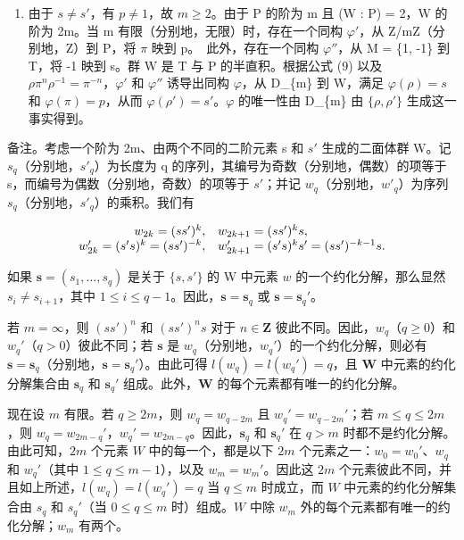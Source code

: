 \begin{enumerate}
\def\labelenumi{(\roman{enumi})}
\setcounter{enumi}{1}
\tightlist
\item
  由于 \(s \neq s'\)，有 \(p \neq 1\)，故 \(m \geqslant 2\)。由于 P 的阶为 m 且 (W : P) = 2，W 的阶为 2m。当 m 有限（分别地，无限）时，存在一个同构 \(\varphi'\)，从 Z/mZ（分别地，Z）到 P，将 \(\pi\) 映到 p。~此外，存在一个同构 \(\varphi''\)，从 M = \{1, -1\} 到 T，将 -1 映到 s。群 W 是 T 与 P 的半直积。根据公式 (9) 以及 \(\rho\pi^{n}\rho^{-1} = \pi^{-n}\)，\(\varphi'\) 和 \(\varphi''\) 诱导出同构 \(\varphi\)，从 D\_\{m\} 到 W，满足 \(\varphi(\rho) = s\) 和 \(\varphi(\pi) = p\)，从而 \(\varphi(\rho') = s'\)。\(\varphi\) 的唯一性由 D\_\{m\} 由 \(\{\rho, \rho'\}\) 生成这一事实得到。
\end{enumerate}

备注。考虑一个阶为 2m、由两个不同的二阶元素 s 和 \(s'\) 生成的二面体群 W。记 \(s_{q}\)（分别地，\(s'_{q}\)）为长度为 q 的序列，其编号为奇数（分别地，偶数）的项等于 s，而编号为偶数（分别地，奇数）的项等于 \(s'\)；并记 \(w_{q}\)（分别地，\(w'_{q}\)）为序列 \(s_{q}\)（分别地，\(s'_{q}\)）的乘积。我们有

\[
\begin{array}{r l} w _ {2 k} = (s s ^ {\prime}) ^ {k}, & w _ {2 k + 1} = (s s ^ {\prime}) ^ {k} s, \\ w _ {2 k} ^ {\prime} = (s ^ {\prime} s) ^ {k} = (s s ^ {\prime}) ^ {- k}, & w _ {2 k + 1} ^ {\prime} = (s ^ {\prime} s) ^ {k} s ^ {\prime} = (s s ^ {\prime}) ^ {- k - 1} s. \end{array}
\]

如果 \(\mathbf{s} = (s_1, \ldots, s_q)\) 是关于 \(\{s, s'\}\) 的 W 中元素 \(w\) 的一个约化分解，那么显然 \(s_i \neq s_{i+1}\)，其中 \(1 \leqslant i \leqslant q-1\)。因此，\(\mathbf{s} = \mathbf{s}_q\) 或 \(\mathbf{s} = \mathbf{s}_q'\)。

若 \(m = \infty\)，则 \((ss')^n\) 和 \((ss')^ns\) 对于 \(n \in \mathbf{Z}\) 彼此不同。因此，\(w_q\)（\(q \geqslant 0\)）和 \(w_q'\)（\(q > 0\)）彼此不同；若 \(\mathbf{s}\) 是 \(w_q\)（分别地，\(w_q'\)）的一个约化分解，则必有 \(\mathbf{s} = \mathbf{s}_q\)（分别地，\(\mathbf{s} = \mathbf{s}_q'\)）。由此可得 \(l(w_q) = l(w_q') = q\)，且 \(\mathbf{W}\) 中元素的约化分解集合由 \(\mathbf{s}_q\) 和 \(\mathbf{s}_q'\) 组成。此外，\(\mathbf{W}\) 的每个元素都有唯一的约化分解。

现在设 \(m\) 有限。若 \(q \geqslant 2m\)，则 \(w_{q} = w_{q - 2m}\) 且 \(w_{q}' = w_{q - 2m}'\)；若 \(m \leqslant q \leqslant 2m\)，则 \(w_{q} = w_{2m - q}'\)，\(w_{q}' = w_{2m - q}\)。因此，\(\mathbf{s}_q\) 和 \(\mathbf{s}_q'\) 在 \(q > m\) 时都不是约化分解。由此可知，\(2m\) 个元素 \(W\) 中的每一个，都是以下 \(2m\) 个元素之一：\(w_0 = w_0'\)、\(w_q\) 和 \(w_q'\)（其中 \(1 \leqslant q \leqslant m - 1\)），以及 \(w_m = w_m'\)。因此这 \(2m\) 个元素彼此不同，并且如上所述，\(l(w_q) = l(w_q') = q\) 当 \(q \leqslant m\) 时成立，而 \(W\) 中元素的约化分解集合由 \(s_q\) 和 \(s_q'\)（当 \(0 \leqslant q \leqslant m\) 时）组成。\(W\) 中除 \(w_m\) 外的每个元素都有唯一的约化分解；\(w_m\) 有两个。

